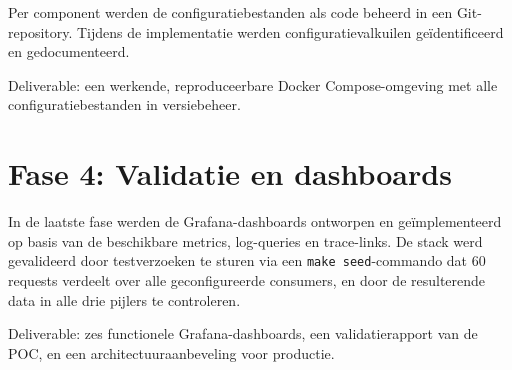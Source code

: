 Per component werden de configuratiebestanden als code beheerd in een Git-repository. Tijdens de implementatie werden configuratievalkuilen geïdentificeerd en gedocumenteerd.

Deliverable: een werkende, reproduceerbare Docker Compose-omgeving met alle configuratiebestanden in versiebeheer.

\section{Fase 4: Validatie en dashboards}%
\label{sec:fase-validatie}

In de laatste fase werden de Grafana-dashboards ontworpen en geïmplementeerd op basis van de beschikbare metrics, log-queries en trace-links. De stack werd gevalideerd door testverzoeken te sturen via een \texttt{make seed}-commando dat 60 requests verdeelt over alle geconfigureerde consumers, en door de resulterende data in alle drie pijlers te controleren.

Deliverable: zes functionele Grafana-dashboards, een validatierapport van de POC, en een architectuuraanbeveling voor productie.

